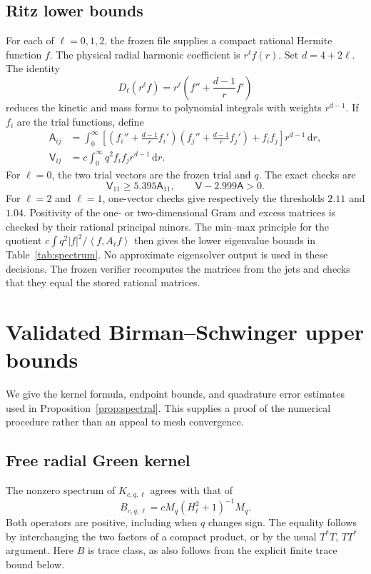 \documentclass[11pt,a4paper]{article}
\theoremstyle{definition}\newtheorem{definition}[theorem]{Definition}
\theoremstyle{remark}\newtheorem{remark}[theorem]{Remark}
\newcommand{\dd}{\,\mathrm d}
\newcommand{\ip}[2]{\left\langle #1,#2\right\rangle}
\newcommand{\file}[1]{\path{#1}}
\begin{document}
\subsection{Ritz lower bounds}
For each of \(\ell=0,1,2\), the frozen file
\file{round2_ritz_exact_data.json}
supplies a compact rational Hermite function \(f\). The physical radial harmonic coefficient is \(r^\ell f(r)\). Set \(d=4+2\ell\). The identity
\[
 D_\ell(r^\ell f)=r^\ell\left(f''+\frac{d-1}r f'\right)
\]
reduces the kinetic and mass forms to polynomial integrals with weights \(r^{d-1}\). If \(f_i\) are the trial functions, define
\begin{align*}
 \mathsf A_{ij}&=\int_0^\infty
 \left[\left(f_i''+\frac{d-1}r f_i'\right)
 \left(f_j''+\frac{d-1}r f_j'\right)+f_if_j\right]r^{d-1}\dd r,\\
 \mathsf V_{ij}&=c\int_0^\infty q^2 f_if_j r^{d-1}\dd r.
\end{align*}
For \(\ell=0\), the two trial vectors are the frozen trial and \(q\). The exact checks are
\[
 \mathsf V_{11}\ge5.395\mathsf A_{11},\qquad
 \mathsf V-2.999\mathsf A>0.
\]
For \(\ell=2\) and \(\ell=1\), one-vector checks give respectively the thresholds \(2.11\) and \(1.04\). Positivity of the one- or two-dimensional Gram and excess matrices is checked by their rational principal minors. The min--max principle for the quotient
\(c\int q^2|f|^2/\ip f{A_\ell f}\)
then gives the lower eigenvalue bounds in Table~\ref{tab:spectrum}. No approximate eigensolver output is used in these decisions. The frozen verifier recomputes the matrices from the jets and checks that they equal the stored rational matrices.

\section{Validated Birman--Schwinger upper bounds}\label{sec:arb}

We give the kernel formula, endpoint bounds, and quadrature error estimates used in Proposition~\ref{prop:spectral}. This supplies a proof of the numerical procedure rather than an appeal to mesh convergence.

\subsection{Free radial Green kernel}
The nonzero spectrum of \(K_{c,q,\ell}\) agrees with that of
\[
 B_{c,q,\ell}=cM_q(H_\ell^2+1)^{-1}M_q.
\]
Both operators are positive, including when \(q\) changes sign. The equality follows by interchanging the two factors of a compact product, or by the usual \(T^*T\), \(TT^*\) argument. Here \(B\) is trace class, as also follows from the explicit finite trace bound below.
\end{document}
